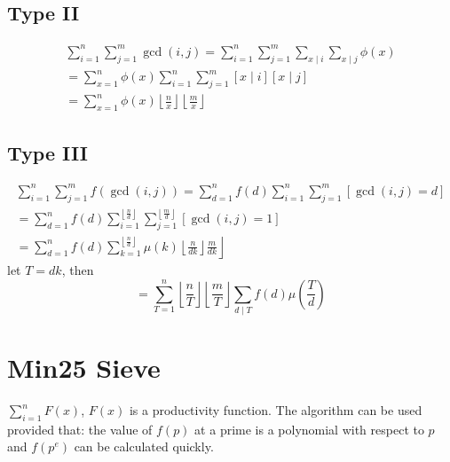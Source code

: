 \subsection{Type II}
\begin{equation}
	\begin{gathered}
	\sum_{i=1}^n \sum_{j=1}^m \operatorname{gcd}(i, j)=\sum_{i=1}^n \sum_{j=1}^m \sum_{x \mid i} \sum_{x \mid j} \phi(x) \\
	=\sum_{x=1}^n \phi(x) \sum_{i=1}^n \sum_{j=1}^m[x \mid i][x \mid j] \\
	=\sum_{x=1}^n \phi(x)\left\lfloor\frac{n}{x}\right\rfloor\left\lfloor\frac{m}{x}\right\rfloor
	\end{gathered}
	\end{equation}

\subsection{Type III}
\begin{equation}
	\begin{gathered}
	\sum_{i=1}^n \sum_{j=1}^m f(\operatorname{gcd}(i, j))=\sum_{d=1}^n f(d) \sum_{i=1}^n \sum_{j=1}^m[\operatorname{gcd}(i, j)=d] \\
	=\sum_{d=1}^n f(d) \sum_{i=1}^{\left\lfloor\frac{n}{d}\right\rfloor} \sum_{j=1}^{\left\lfloor\frac{m}{d}\right\rfloor}[\operatorname{gcd}(i, j)=1] \\
	\left.=\sum_{d=1}^n f(d) \sum_{k=1}^{\left\lfloor\frac{n}{d}\right\rfloor} \mu(k)\left\lfloor\frac{n}{d k}\right\rfloor \frac{m}{d k}\right\rfloor
	\end{gathered}
	\end{equation}
	let $T=dk$, then
	\begin{equation}
		=\sum_{T=1}^n\left\lfloor\frac{n}{T}\right\rfloor\left\lfloor\frac{m}{T}\right\rfloor \sum_{d \mid T} f(d) \mu\left(\frac{T}{d}\right)
		\end{equation}
 \section{Min25 Sieve}
 $\sum_{i=1}^{n} F(x)$, $F(x)$ is a productivity function. The algorithm can be used provided that: the value of $f(p)$ at a prime is a polynomial with respect to $p$ and $f\left(p^{e}\right)$ can be calculated quickly.
